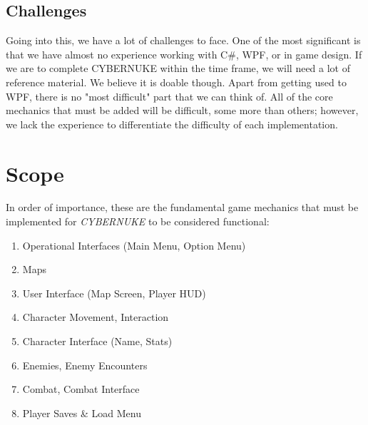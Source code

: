 \documentclass[10pt,conference,onecolumn,compsoc]{IEEEtran}
\begin{document}
\subsection{Challenges}
Going into this, we have a lot of challenges to face. One of the most significant is that we have almost no experience working with C\#, WPF, or in game design. If we are to complete CYBERNUKE within the time frame, we will need a lot of reference material. We believe it is doable though. 
Apart from getting used to WPF, there is no "most difficult" part that we can think of. All of the core mechanics that must be added will be difficult, some more than others; however, we lack the experience to differentiate the difficulty of each implementation. 



\section{Scope}
In order of importance, these are the fundamental game mechanics that must be implemented for \emph{CYBERNUKE} to be considered functional:
\begin{enumerate}
\item Operational Interfaces (Main Menu, Option Menu)
\item Maps
\item User Interface (Map Screen, Player HUD)
\item Character Movement, Interaction
\item Character Interface (Name, Stats)
\item Enemies, Enemy Encounters
\item Combat, Combat Interface
\item Player Saves \& Load Menu
\end{enumerate} 
\end{document}
